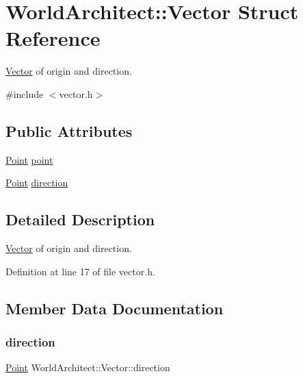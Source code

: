 \hypertarget{struct_world_architect_1_1_vector}{}\section{World\+Architect\+::Vector Struct Reference}
\label{struct_world_architect_1_1_vector}


\mbox{\hyperlink{struct_world_architect_1_1_vector}{Vector}} of origin and direction.  




{\ttfamily \#include $<$vector.\+h$>$}

\subsection*{Public Attributes}
\begin{DoxyCompactItemize}
\item 
\mbox{\hyperlink{namespace_world_architect_afe984ab247ed2917d3a738c7d83d33ca}{Point}} \mbox{\hyperlink{struct_world_architect_1_1_vector_a4024cdb2b1762318504be5d4872aa740}{point}}
\item 
\mbox{\hyperlink{namespace_world_architect_afe984ab247ed2917d3a738c7d83d33ca}{Point}} \mbox{\hyperlink{struct_world_architect_1_1_vector_a37f10ce3ced89176050b0512dfc7f0b4}{direction}}
\end{DoxyCompactItemize}


\subsection{Detailed Description}
\mbox{\hyperlink{struct_world_architect_1_1_vector}{Vector}} of origin and direction. 

Definition at line 17 of file vector.\+h.



\subsection{Member Data Documentation}
\mbox{\label{struct_world_architect_1_1_vector_a37f10ce3ced89176050b0512dfc7f0b4}} 
\subsubsection{\texorpdfstring{direction}{direction}}
{\footnotesize\ttfamily \mbox{\hyperlink{namespace_world_architect_afe984ab247ed2917d3a738c7d83d33ca}{Point}} World\+Architect\+::\+Vector\+::direction}



